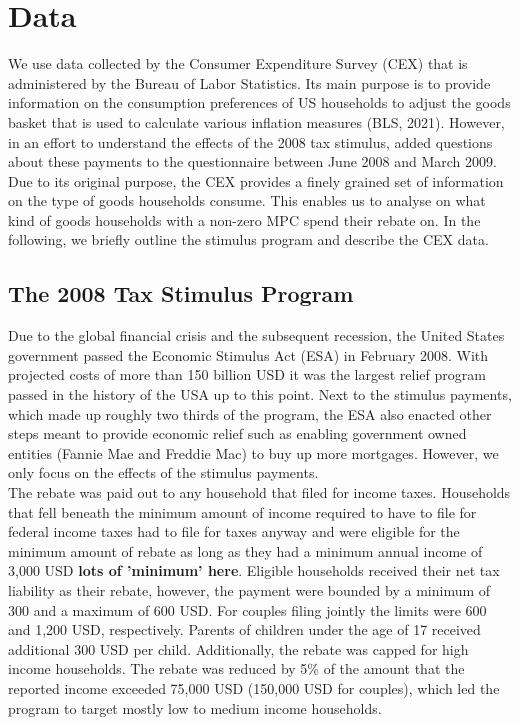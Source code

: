 \newpage
\section{Data} \label{sec:data}
We use data collected by the Consumer Expenditure Survey (CEX) that is administered by the Bureau of Labor Statistics. Its main purpose is to provide information on the consumption preferences of US households to adjust the goods basket that is used to calculate various inflation measures (BLS, 2021). However, in an effort to understand the effects of the 2008 tax stimulus, \cite{parker_etal_13} added questions about these payments to the questionnaire between June 2008 and March 2009.  Due to its original purpose, the CEX provides a finely grained set of information on the type of goods households consume. This enables us to analyse on what kind of goods households with a non-zero MPC spend their rebate on. In the following, we briefly outline the stimulus program and describe the CEX data. 

\subsection{The 2008 Tax Stimulus Program} 
Due to the global financial crisis and the subsequent recession, the United States government passed the Economic Stimulus Act (ESA) in February 2008. With projected costs of more than 150 billion USD it was the largest relief program passed in the history of the USA up to this point. Next to the stimulus payments, which made up roughly two thirds of the program, the ESA also enacted other steps meant to provide economic relief such as enabling government owned entities (Fannie Mae and Freddie Mac) to buy up more mortgages. However, we only focus on the effects of the stimulus payments. \\
The rebate was paid out to any household that filed for income taxes. Households that fell beneath the minimum amount of income required to have to file for federal income taxes had to file for taxes anyway and were eligible for the minimum amount of rebate as long as they had a minimum annual income of 3,000 USD \textbf{lots of 'minimum' here}. Eligible households received their net tax liability as their rebate, however, the payment were bounded by a minimum of 300 and a maximum of 600 USD. For couples filing jointly the limits were 600 and 1,200 USD, respectively. Parents of children under the age of 17 received additional 300 USD per child. Additionally, the rebate was capped for high income households. The rebate was reduced by 5\% of the amount that the reported income exceeded 75,000 USD (150,000 USD for couples), which led the program to target mostly low to medium income households.

